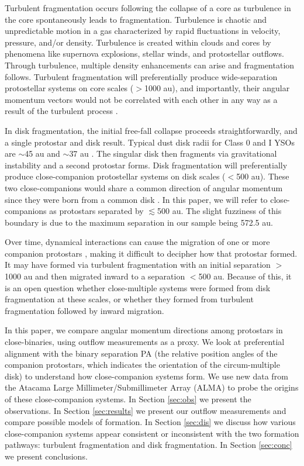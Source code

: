 \documentclass[linenumbers,twocolumn, twocolappendix]{aastex631}
\begin{document}
Turbulent fragmentation occurs following the collapse of a core as turbulence in the core spontaneously leads to fragmentation. Turbulence is chaotic and unpredictable motion in a gas characterized by rapid fluctuations in velocity, pressure, and/or density. Turbulence is created within clouds and cores by phenomena like supernova explosions, stellar winds, and protostellar outflows. Through turbulence, multiple density enhancements can arise and fragmentation follows. Turbulent fragmentation will preferentially produce wide-separation protostellar systems on core scales ($>$1000 au), and importantly, their angular momentum vectors would not be correlated with each other in any way as a result of the turbulent process \citep{Offner_et_al_2016}. 

In disk fragmentation, the initial free-fall collapse proceeds straightforwardly, and a single protostar and disk result. Typical dust disk radii for Class 0 and I YSOs are $\sim$45 au and $\sim$37 au \citep{Tobin_2020}. The singular disk then fragments via gravitational instability and a second protostar forms. Disk fragmentation will preferentially produce close-companion protostellar systems on disk scales ($<$500 au). These two close-companions would share a common direction of angular momentum since they were born from a common disk \citep{Bate_2018}. In this paper, we will refer to close-companions as protostars separated by $\lesssim$500 au. The slight fuzziness of this boundary is due to the maximum separation in our sample being 572.5 au.

Over time, dynamical interactions can cause the migration of one or more companion protostars \citep{Offner_et_al_2010, Bate_2012}, making it difficult to decipher how that protostar formed. It may have formed via turbulent fragmentation with an initial separation $>$1000 au and then migrated inward to a separation $<$500 au. Because of this, it is an open question whether close-multiple systems were formed from disk fragmentation at these scales, or whether they formed from turbulent fragmentation followed by inward migration. 

In this paper, we compare angular momentum directions among protostars in close-binaries, using outflow measurements as a proxy. We look at preferential alignment with the binary separation PA (the relative position angles of the companion protostars, which indicates the orientation of the circum-multiple disk) to understand how close-companion systems form. We use new data from the Atacama Large Millimeter/Submillimeter Array (ALMA) to probe the origins of these close-companion systems. In Section \ref{sec:obs} we present the observations. In Section \ref{sec:results} we present our outflow measurements and compare possible models of formation. In Section \ref{sec:dis} we discuss how various close-companion systems appear consistent or inconsistent with the two formation pathways: turbulent fragmentation and disk fragmentation. In Section \ref{sec:conc} we present conclusions.
\end{document}
